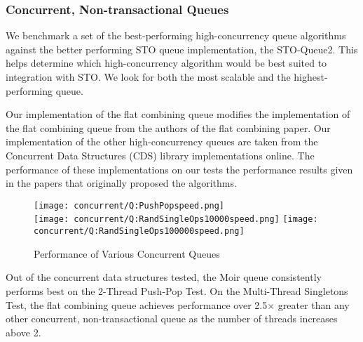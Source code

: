 \subsubsection{Concurrent, Non-transactional Queues}

We benchmark a set of the best-performing high-concurrency queue algorithms against the better performing STO queue implementation, the STO-Queue2. This helps determine which high-concurrency algorithm would be best suited to integration with STO. We look for both the most scalable and the highest-performing queue.
 
 Our implementation of the flat combining queue modifies the implementation of the flat combining queue from the authors of the flat combining paper\cite{flatcombining}. Our implementation of the other high-concurrency queues are taken from the Concurrent Data Structures (CDS) library implementations online\cite{libcds}. The performance of these implementations on our tests the performance results given in the papers that originally proposed the algorithms.

\begin{figure}[h!]
\centering
    \texttt{[image: concurrent/Q:PushPopspeed.png]}\\
    \texttt{[image: concurrent/Q:RandSingleOps10000speed.png]}
    \texttt{[image: concurrent/Q:RandSingleOps100000speed.png]}
\caption{Performance of Various Concurrent Queues}
\label{fig:concurrent_queues}
\end{figure}

Out of the concurrent data structures tested, the Moir queue\cite{queue2} consistently performs best on the 2-Thread Push-Pop Test. On the Multi-Thread Singletons Test, the flat combining queue achieves performance over 2.5$\times$ greater than any other concurrent, non-transactional queue as the number of threads increases above 2.

